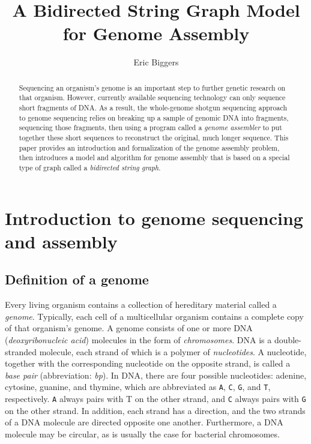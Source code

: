 \documentclass[10pt]{article}
\title{A Bidirected String Graph Model for Genome Assembly}
\author{Eric Biggers}
\newcommand\Base[1]{{\tt #1}}
\newcommand{\KeyTerm}[1]{{\it #1}}
\begin{document}
\maketitle

\begin{abstract}

Sequencing an organism's genome is an important step to further genetic research
on that organism.  However, currently available sequencing technology can only
sequence short fragments of DNA.  As a result, the whole-genome shotgun
sequencing approach to genome sequencing relies on breaking up a sample of
genomic DNA into fragments, sequencing those fragments, then using a program
called a {\em genome assembler} to put together these short sequences to
reconstruct the original, much longer sequence.  This paper provides an
introduction and formalization of the genome assembly problem, then introduces a
model and algorithm for genome assembly that is based on a special type of graph
called a \KeyTerm{bidirected string graph}.  \end{abstract}

\tableofcontents

\section{Introduction to genome sequencing and assembly}

\subsection{Definition of a genome}

Every living organism contains a collection of hereditary material called a
\KeyTerm{genome}.  Typically, each cell of a multicellular organism contains a
complete copy of that organism's genome.  A genome consists of one or more DNA
(\KeyTerm{deoxyribonucleic acid}) molecules in the form of
\KeyTerm{chromosomes}.  DNA is a double-stranded molecule, each strand of which
is a polymer of \KeyTerm{nucleotides}.  A nucleotide, together with the
corresponding nucleotide on the opposite strand, is called a \KeyTerm{base pair}
(abbreviation: \KeyTerm{bp}).  In DNA, there are four possible nucleotides:
adenine, cytosine, guanine, and thymine, which are abbreviated as \Base{A},
\Base{C}, \Base{G}, and \Base{T}, respectively.  \Base{A} always pairs with T on
the other strand, and \Base{C} always pairs with \Base{G} on the other strand.
In addition, each strand has a direction, and the two strands of a DNA molecule
are directed opposite one another.  Furthermore, a DNA molecule may be circular,
as is usually the case for bacterial chromosomes.
\end{document}
